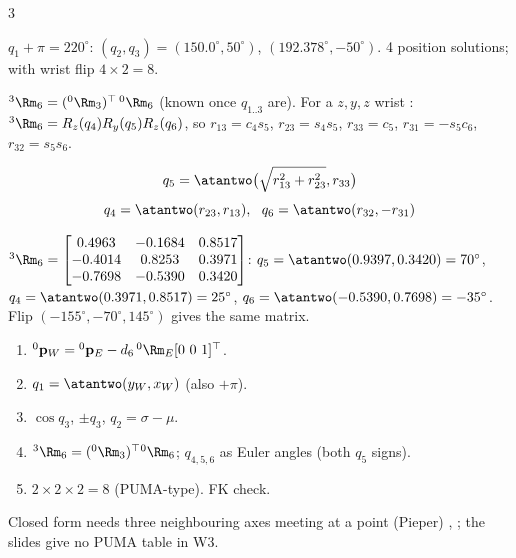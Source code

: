 \begin{multicols}{3}
\begin{worked}
$q_1+\pi=220^\circ$: $(q_2,q_3)=(150.0^\circ,50^\circ)$, $(192.378^\circ,-50^\circ)$. 4 position solutions; with wrist flip $4\times2=8$. \chk
\end{worked}
\begin{deriv}[wrist \pg{38}]
${}^3\Rm_6=({}^0\Rm_3)^\top\,{}^0\Rm_6$ (known once $q_{1..3}$ are). For a $z,y,z$ wrist \added: ${}^3\Rm_6=R_z(q_4)R_y(q_5)R_z(q_6)$, so $r_{13}=c_4s_5$, $r_{23}=s_4s_5$, $r_{33}=c_5$, $r_{31}=-s_5c_6$, $r_{32}=s_5s_6$.
\end{deriv}
\begin{fbx}
\[q_5=\atantwo\big(\sqrt{r_{13}^2+r_{23}^2},r_{33}\big)\]\[q_4=\atantwo(r_{23},r_{13}),\ \ q_6=\atantwo(r_{32},-r_{31})\]
\end{fbx}
\begin{worked}
${}^3\Rm_6=\begin{bmatrix}0.4963&-0.1684&0.8517\\-0.4014&0.8253&0.3971\\-0.7698&-0.5390&0.3420\end{bmatrix}$: $q_5=\atantwo(0.9397,0.3420)=70^\circ$, $q_4=\atantwo(0.3971,0.8517)=25^\circ$, $q_6=\atantwo(-0.5390,0.7698)=-35^\circ$. Flip $(-155^\circ,-70^\circ,145^\circ)$ gives the same matrix. \chk
\end{worked}
\begin{recipe}
\label{w3:wrist}
\begin{enumerate}
\item ${}^0\mathbf p_W={}^0\mathbf p_E-d_6\,{}^0\Rm_E[0\ 0\ 1]^\top$.
\item $q_1=\atantwo(y_W,x_W)$ (also $+\pi$).
\item $\cos q_3$, $\pm q_3$, $q_2=\sigma-\mu$.
\item ${}^3\Rm_6=({}^0\Rm_3)^\top{}^0\Rm_6$; $q_{4,5,6}$ as Euler angles (both $q_5$ signs).
\item $2\times2\times2=8$ (PUMA-type). FK check.
\end{enumerate}
\end{recipe}
Closed form needs three neighbouring axes meeting at a point (Pieper) \added, ; the slides give no PUMA table in W3.


\end{multicols}

